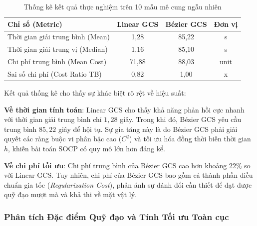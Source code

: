 \begin{table}[!htp]
    \centering
    \caption{Thống kê kết quả thực nghiệm trên 10 mẫu mê cung ngẫu nhiên}
    \label{tab:maze_results}
    \begin{tabular}{|l|c|c|c|}
        \hline
        \textbf{Chỉ số (Metric)} 
        & \textbf{Linear GCS} 
        & \textbf{Bézier GCS} 
        & \textbf{Đơn vị} \\
        \hline
        Thời gian giải trung bình (Mean) 
        & 1,28 
        & 85,22 
        & s \\
        \hline
        Thời gian giải trung vị (Median) 
        & 1,16 
        & 85,10 
        & s \\
        \hline
        Chi phí trung bình (Mean Cost) 
        & 71,88 
        & 88,03 
        & unit \\
        \hline
        Sai số chi phí (Cost Ratio TB) 
        & 0,82 
        & 1,00 
        & x \\
        \hline
    \end{tabular}
\end{table}

Kết quả thống kê cho thấy sự khác biệt rõ rệt về hiệu suất:

\textbf{Về thời gian tính toán}: Linear GCS cho thấy khả năng phản hồi cực nhanh với thời gian giải trung bình chỉ $1,28$ giây. Trong khi đó, Bézier GCS yêu cầu trung bình $85,22$ giây để hội tụ. Sự gia tăng này là do Bézier GCS phải giải quyết các ràng buộc vi phân bậc cao ($C^2$) và tối ưu hóa đồng thời biến thời gian $h$, khiến bài toán SOCP có quy mô lớn hơn đáng kể.
    
\textbf{Về chi phí tối ưu}: Chi phí trung bình của Bézier GCS cao hơn khoảng $22\%$ so với Linear GCS. Tuy nhiên, chi phí của Bézier GCS bao gồm cả thành phần điều chuẩn gia tốc (\textit{Regularization Cost}), phản ánh sự đánh đổi cần thiết để đạt được quỹ đạo mượt mà và khả thi về mặt vật lý.


\subsubsection{Phân tích Đặc điểm Quỹ đạo và Tính Tối ưu Toàn cục}

